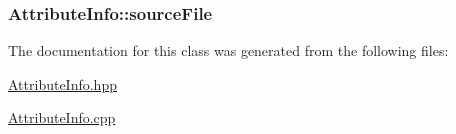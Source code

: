 \subsubsection[{\texorpdfstring{source\+File}{sourceFile}}]{ Attribute\+Info\+::source\+File}\hypertarget{class_attribute_info_afcfcce1e1e4ea2a3461a00dd724847ac}{}\label{class_attribute_info_afcfcce1e1e4ea2a3461a00dd724847ac}


The documentation for this class was generated from the following files\+:\begin{DoxyCompactItemize}
\item 
\hyperlink{_attribute_info_8hpp}{Attribute\+Info.\+hpp}\item 
\hyperlink{_attribute_info_8cpp}{Attribute\+Info.\+cpp}\end{DoxyCompactItemize}
